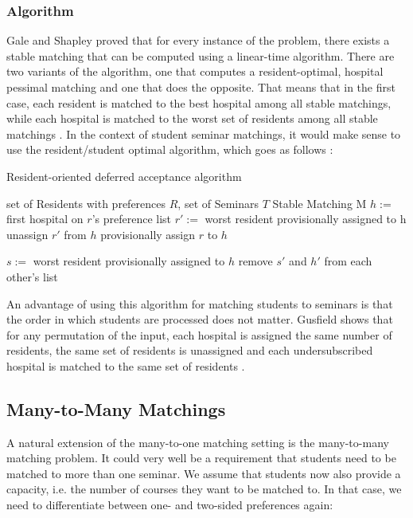 \subsubsection{Algorithm}
Gale and Shapley \cite{GaleShapleyOrig} proved that for every instance of the problem, there exists a stable matching that can be computed using a linear-time algorithm. There are two variants of the algorithm, one that computes a resident-optimal, hospital pessimal matching and one that does the opposite. That means that in the first case, each resident is matched to the best hospital among all stable matchings, while each hospital is matched to the worst set of residents among all stable matchings \cite{Gusfield}. In the context of student seminar matchings, it would make sense to use the resident/student optimal algorithm, which goes as follows \cite{Gusfield}:
\begin{algorithm} %
    \caption{Resident-oriented deferred acceptance algorithm} 
    \label{alg:resident-oriented-algorithm} 
    \begin{algorithmic} %
        \Require set of Residents with preferences $R$, set of Seminars $T$
        \Ensure Stable Matching M
        \State $h:=$ first hospital on $r$'s preference list
            \State $r':=$ worst resident provisionally assigned to h
            \State unassign $r'$ from $h$
        \EndIf
        \State provisionally assign $r$ to $h$

            $s:=$ worst resident provisionally assigned to $h$
                \State remove $s'$ and $h'$ from each other's list
            \EndFor
        \EndIf

        \EndWhile
    \end{algorithmic}
\end{algorithm}

An advantage of using this algorithm for matching students to seminars is that the order in which students are processed does not matter. Gusfield shows that for any permutation of the input, each hospital is assigned the same number of residents, the same set of residents is unassigned and each undersubscribed hospital is matched to the same set of residents \cite{Gusfield}.

\subsection{Many-to-Many Matchings}
A natural extension of the many-to-one matching setting is the many-to-many matching problem. It could very well be a requirement that students need to be matched to more than one seminar. We assume that students now also provide a capacity, i.e. the number of courses they want to be matched to. In that case, we need to differentiate between one- and two-sided preferences again:

